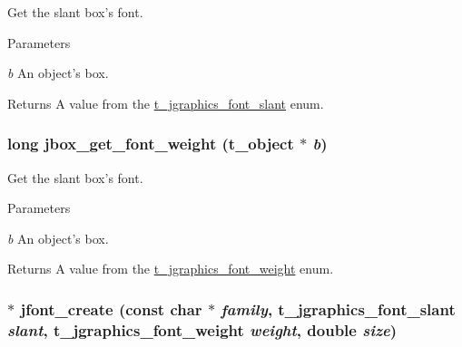Get the slant box's font. 
\begin{DoxyParams}{Parameters}
\item[{\em b}]An object's box. \end{DoxyParams}
\begin{DoxyReturn}{Returns}
A value from the \hyperlink{group__jfont_gaea63403193677b088b56cb60c69c37b4}{t\_\-jgraphics\_\-font\_\-slant} enum. 
\end{DoxyReturn}
\hypertarget{group__jfont_gabff7a5c0793cab2aed118f82ab3d520a}{
\subsubsection[{jbox\_\-get\_\-font\_\-weight}]{\setlength{\rightskip}{0pt plus 5cm}long jbox\_\-get\_\-font\_\-weight ({\bf t\_\-object} $\ast$ {\em b})}}
\label{group__jfont_gabff7a5c0793cab2aed118f82ab3d520a}


Get the slant box's font. 
\begin{DoxyParams}{Parameters}
\item[{\em b}]An object's box. \end{DoxyParams}
\begin{DoxyReturn}{Returns}
A value from the \hyperlink{group__jfont_ga29fc4356e11166a16aeae50dd5e22f86}{t\_\-jgraphics\_\-font\_\-weight} enum. 
\end{DoxyReturn}
\hypertarget{group__jfont_gae09cf4470873157407375af651cabcff}{
\subsubsection[{jfont\_\-create}]{$\ast$ jfont\_\-create (const char $\ast$ {\em family}, \/  {\bf t\_\-jgraphics\_\-font\_\-slant} {\em slant}, \/  {\bf t\_\-jgraphics\_\-font\_\-weight} {\em weight}, \/  double {\em size})}}
\label{group__jfont_gae09cf4470873157407375af651cabcff}


